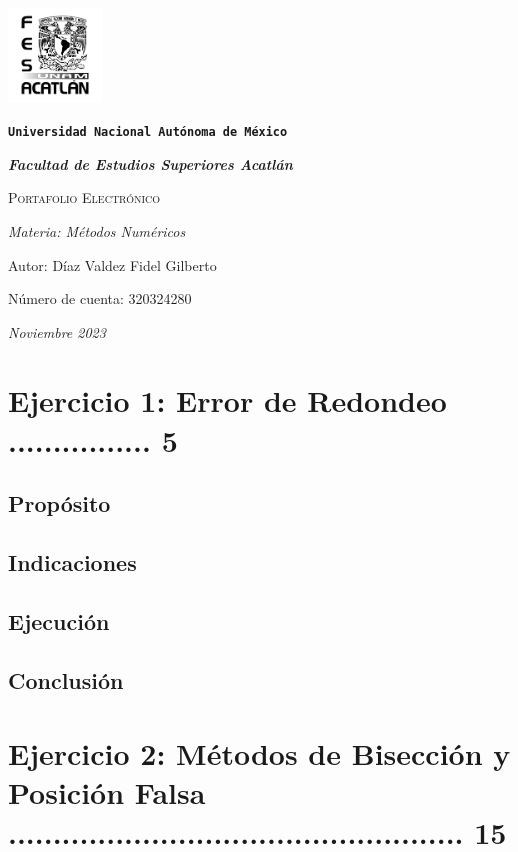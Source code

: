 \documentclass{article}
\begin{document}
\begin{titlepage}
    \centering
    {\includegraphics[width=2.5cm]{logo.png}\par}
    {\texttt{\bfseries \LARGE Universidad Nacional Autónoma de México} \par}
    \vspace{1cm}
    {\itshape \Large \bfseries Facultad de Estudios Superiores Acatlán \par}
    \vspace{3cm}
    {\scshape \Huge Portafolio Electrónico \par}
    \vspace {3cm}
    {\slshape \Large Materia: Métodos Numéricos \par}
    \vspace{2cm}
    {\Large Autor: Díaz Valdez Fidel Gilberto\par}
    {\Large Número de cuenta: 320324280\par}
    \vfill
    {\itshape Noviembre 2023 \par}
\end{titlepage}


\tableofcontents
\section{Ejercicio 1: Error de Redondeo ................ 5 }
\subsection{Propósito}
\subsection{Indicaciones}
\subsection{Ejecución}
\subsection{Conclusión}

\section{Ejercicio 2: Métodos de Bisección y Posición Falsa ................................................... 15}
\end{document}
